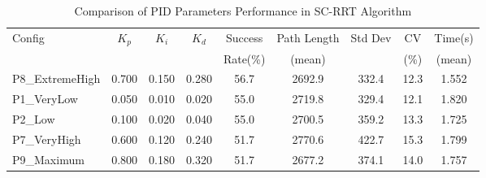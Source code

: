 
\begin{table}[htbp]
\centering
\caption{Comparison of PID Parameters Performance in SC-RRT Algorithm}
\label{tab:pid_comparison}
\begin{tabular}{lcccccccc}
\hline
Config & $K_p$ & $K_i$ & $K_d$ & Success & Path Length & Std Dev & CV & Time(s) \\
 & & & & Rate(\%) & (mean) & & (\%) & (mean) \\
\hline
P8\_ExtremeHigh & 0.700 & 0.150 & 0.280 & 56.7 & 2692.9 & 332.4 & 12.3 & 1.552 \\
P1\_VeryLow & 0.050 & 0.010 & 0.020 & 55.0 & 2719.8 & 329.4 & 12.1 & 1.820 \\
P2\_Low & 0.100 & 0.020 & 0.040 & 55.0 & 2700.5 & 359.2 & 13.3 & 1.725 \\
P7\_VeryHigh & 0.600 & 0.120 & 0.240 & 51.7 & 2770.6 & 422.7 & 15.3 & 1.799 \\
P9\_Maximum & 0.800 & 0.180 & 0.320 & 51.7 & 2677.2 & 374.1 & 14.0 & 1.757 \\
\hline
\end{tabular}
\end{table}

